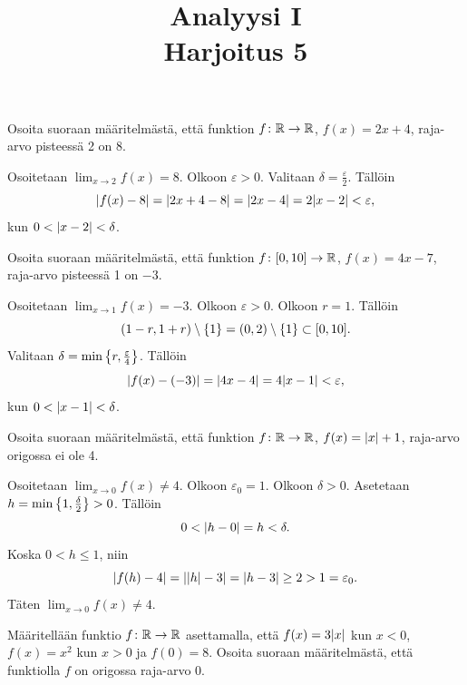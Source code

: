 \documentclass[11pt,a4paper]{amsart}
\title{Analyysi I\\Harjoitus 5}
\author{}
\date{}
\begin{document}

\begin{exercise}
  Osoita suoraan määritelmästä, että funktion \(f\colon \mathbb{R} \to \mathbb{R}\),
  \(f(x) = 2x + 4\), raja-arvo pisteessä 2 on 8.
\end{exercise}

\begin{solution}
  Osoitetaan \(\lim_{x \to 2} f(x) = 8\). Olkoon \(\varepsilon > 0\). Valitaan
  \(\delta = \frac{\varepsilon}{2}\). Tällöin
  \[
    \lvert f(x) - 8\rvert = \lvert2x + 4 - 8\rvert = \lvert2x - 4\rvert = 2\lvert x - 2\rvert <
    \varepsilon,
  \]
  kun \(0 < \lvert x - 2\rvert < \delta\).
\end{solution}

\begin{exercise}
  Osoita suoraan määritelmästä, että funktion \(f\colon [0,10] \to \mathbb{R}\),
  \(f(x) = 4x - 7\), raja-arvo pisteessä 1 on \(-3\).
\end{exercise}

\begin{solution}
  Osoitetaan \(\lim_{x \to 1} f(x) = -3\). Olkoon \(\varepsilon > 0\). Olkoon
  \(r = 1\). Tällöin
  \[
    (1 - r, 1 + r) \setminus \left\lbrace1\right\rbrace = (0, 2) \setminus \left\lbrace1\right\rbrace \subset [0, 10].
  \]
  Valitaan \(\delta = \min\left\lbrace r, \frac{\varepsilon}{4}\right\rbrace\). Tällöin
  \[
    \lvert f(x) - (-3)\rvert = \lvert4x - 4\rvert = 4\lvert x - 1\rvert < \varepsilon,
  \]
  kun \(0 < \lvert x - 1\rvert < \delta\).
\end{solution}

\begin{exercise}
  Osoita suoraan määritelmästä, että funktion \(f\colon \mathbb{R} \to \mathbb{R}\),
  \(f(x) = \lvert x\rvert + 1\), raja-arvo origossa ei ole 4.
\end{exercise}

\begin{solution}
  Osoitetaan \(\lim_{x \to 0} f(x) \neq 4\). Olkoon \(\varepsilon_0 = 1\).
  Olkoon \(\delta > 0\). Asetetaan \(h = \min\left\lbrace1, \frac{\delta}{2}\right\rbrace > 0\).
  Tällöin
  \[
    0 < \lvert h - 0\rvert = h < \delta.
  \]
  Koska \(0 < h \leq 1\), niin
  \[
    \lvert f(h) - 4\rvert = \lvert\lvert h\rvert - 3\rvert = \lvert h - 3\rvert \geq 2 > 1 = \varepsilon_0.
  \]
  Täten \(\lim_{x \to 0} f(x) \neq 4\).
\end{solution}

\begin{exercise}
  Määritellään funktio \(f\colon \mathbb{R} \to \mathbb{R}\) asettamalla, että
  \(f(x) = 3\lvert x\rvert\) kun \(x < 0\), \(f(x) = x^2\) kun \(x > 0\)
  ja \(f(0) = 8\). Osoita suoraan määritelmästä, että funktiolla \(f\)
  on origossa raja-arvo 0.
\end{exercise}
\end{document}
